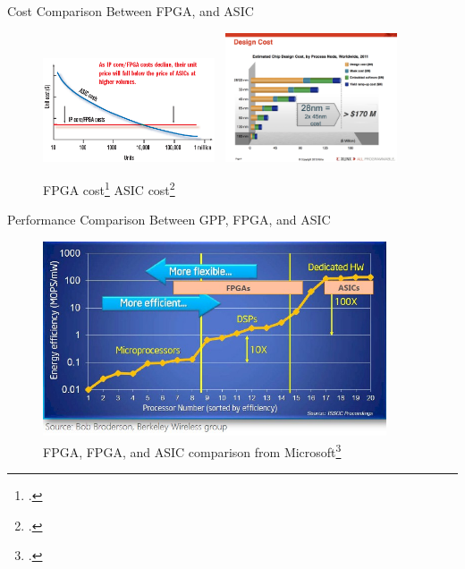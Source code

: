 \documentclass[t]{beamer}
\begin{document}
\begin{frame}{Cost Comparison Between FPGA, and ASIC}
    \begin{figure}
        \includegraphics[width=2in]{img/FPGA-cost.png}~
        \includegraphics[width=2in]{img/ASIC-cost.png}
        \caption{FPGA cost\footcite{http://electronicdesign.com/files/29/12966/figure_01.gif}
                 ASIC cost\footcite{http://electroiq.com/blog/2014/02/semi-iss-scaling-innovation/}}
        \label{fig:cost-comparison}
    \end{figure}
\end{frame}

\begin{frame}{Performance Comparison Between GPP, FPGA, and ASIC}
    \begin{figure}
        \includegraphics[width=4in]{img/microsoft-fpga-vs-cpu-vs-asic.png}
        \caption{FPGA, FPGA, and ASIC comparison from Microsoft\footcite{http://www.theplatform.net/2015/03/30/why-intel-might-buy-fpga-maker-altera}}
        \label{fig:performance-comparison}
    \end{figure}
\end{frame}
\end{document}
